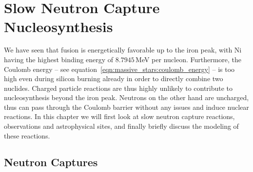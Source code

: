 
\chapter{Slow Neutron Capture Nucleosynthesis}\label{ch:s-process}

We have seen that fusion is energetically favorable up to the iron peak, with Ni having the highest binding energy of $8.7945$\,MeV per nucleon. Furthermore, the Coulomb energy -- see equation~\eqref{eqn:massive_stars:coulomb_energy} -- is too high even during silicon burning already in order to directly combine two nuclides. Charged particle reactions are thus highly unlikely to contribute to nucleosynthesis beyond the iron peak. Neutrons on the other hand are uncharged, thus can pass through the Coulomb barrier without any issues and induce nuclear reactions. In this chapter we will first look at slow neutron capture reactions, observations and astrophysical sites, and finally briefly discuss the modeling of these reactions.


\section{Neutron Captures} \label{sec:s-process:neutron_captures}

